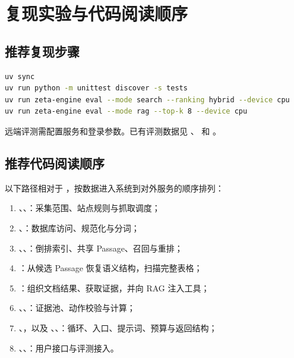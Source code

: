 \documentclass[UTF8,zihao=-4,fontset=fandol]{ctexart}
\begin{document}
\printbibliography[title={参考文献}]

\appendix
\section{复现实验与代码阅读顺序}

\subsection{推荐复现步骤}

\begin{lstlisting}[language=bash,caption={测试与评测命令}]
uv sync
uv run python -m unittest discover -s tests
uv run zeta-engine eval --mode search --ranking hybrid --device cpu
uv run zeta-engine eval --mode rag --top-k 8 --device cpu
\end{lstlisting}

远端评测需配置服务和登录参数。已有评测数据见 、 和 。

\subsection{推荐代码阅读顺序}

以下路径相对于 ，按数据进入系统到对外服务的顺序排列：

\begin{enumerate}
  \item {}、、：采集范围、站点规则与抓取调度；
  \item {}、：数据库访问、规范化与分词；
  \item {}、、：倒排索引、共享 Passage、召回与重排；
  \item {}：从候选 Passage 恢复语义结构，扫描完整表格；
  \item {}：组织文档结果、获取证据，并向 RAG 注入工具；
  \item {}、、：证据池、动作校验与计算；
  \item {}、，以及 、、：循环、入口、提示词、预算与返回结构；
  \item {}、、：用户接口与评测接入。
\end{enumerate}
\end{document}
